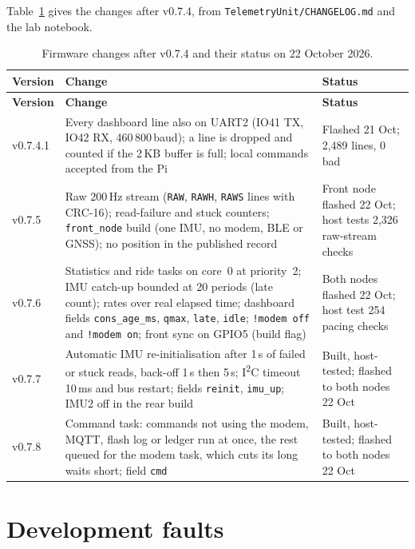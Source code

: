Table~\ref{tab:fw-versions} gives the changes after v0.7.4, from \texttt{TelemetryUnit/\allowbreak{}CHANGELOG.md} and the lab notebook.

{\small
\begin{longtable}{|>{\raggedright\arraybackslash}p{1.5cm}|>{\raggedright\arraybackslash}p{8.6cm}|>{\raggedright\arraybackslash}p{3.6cm}|}
\caption[Firmware changes after v0.7.4 and their status on 22 October 2026]{Firmware changes after v0.7.4 and their status on 22 October 2026.}
\label{tab:fw-versions}\\
\hline
\textbf{Version} & \textbf{Change} & \textbf{Status} \\ \hline
\endfirsthead
\hline
\textbf{Version} & \textbf{Change} & \textbf{Status} \\ \hline
\endhead
v0.7.4.1 & Every dashboard line also on UART2 (IO41 TX, IO42 RX, 460\,800\,baud); a line is dropped and counted if the 2\,KB buffer is full; local commands accepted from the Pi & Flashed 21 Oct; 2,489 lines, 0 bad \\ \hline
v0.7.5 & Raw 200\,Hz stream (\texttt{RAW}, \texttt{RAWH}, \texttt{RAWS} lines with CRC-16); read-failure and stuck counters; \texttt{front\_node} build (one IMU, no modem, BLE or GNSS); no position in the published record & Front node flashed 22 Oct; host tests 2,326 raw-stream checks \\ \hline
v0.7.6 & Statistics and ride tasks on core~0 at priority~2; IMU catch-up bounded at 20 periods (late count); rates over real elapsed time; dashboard fields \texttt{cons\_age\_ms}, \texttt{qmax}, \texttt{late}, \texttt{idle}; \texttt{!modem off} and \texttt{!modem on}; front sync on GPIO5 (build flag) & Both nodes flashed 22 Oct; host test 254 pacing checks \\ \hline
v0.7.7 & Automatic IMU re-initialisation after 1\,s of failed or stuck reads, back-off 1\,s then 5\,s; I\textsuperscript{2}C timeout 10\,ms and bus restart; fields \texttt{reinit}, \texttt{imu\_up}; IMU2 off in the rear build & Built, host-tested; flashed to both nodes 22 Oct \\ \hline
v0.7.8 & Command task: commands not using the modem, MQTT, flash log or ledger run at once, the rest queued for the modem task, which cuts its long waits short; field \texttt{cmd} & Built, host-tested; flashed to both nodes 22 Oct \\ \hline
\end{longtable}
}

\section{Development faults}

